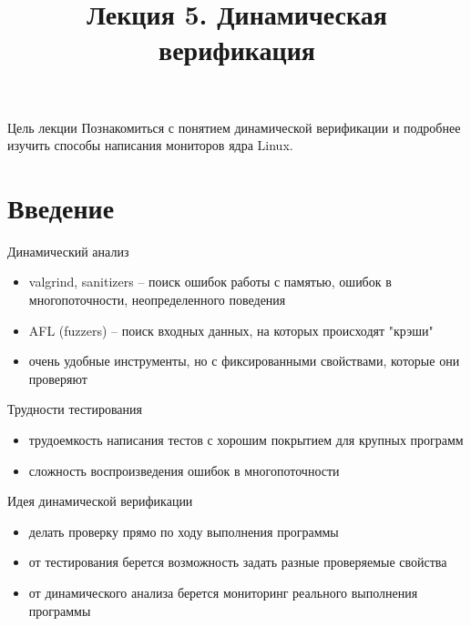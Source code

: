 \documentclass[hyperref={unicode=true}]{beamer}
\title{Лекция 5. Динамическая верификация}
\author{}
\date{}
\begin{document}
	\begin{frame}{}
		\titlepage
	\end{frame}

    \begin{frame}{Цель лекции}
    Познакомиться с понятием динамической верификации
    и подробнее изучить способы написания мониторов ядра Linux.
    \end{frame}

    \section{Введение}

	\begin{frame}{Динамический анализ}
    \begin{itemize}
        \item valgrind, sanitizers -- поиск ошибок работы
        с памятью, ошибок в многопоточности, неопределенного
        поведения

        \item AFL (fuzzers) -- поиск входных данных, на которых
        происходят "крэши"

        \item очень удобные инструменты, но с фиксированными
        свойствами, которые они проверяют
	\end{itemize}
    \end{frame}

    \begin{frame}{Трудности тестирования}
    \begin{itemize}
        \item трудоемкость написания тестов с хорошим
        покрытием для крупных программ

        \item сложность воспроизведения ошибок
        в многопоточности
    \end{itemize}
    \end{frame}

    \begin{frame}{Идея динамической верификации}
    \begin{itemize}
       \item делать проверку прямо по ходу выполнения
       программы
       \item от тестирования берется возможность задать
       разные проверяемые свойства
       \item от динамического анализа берется
       мониторинг реального выполнения программы
    \end{itemize}
    \end{frame}
\end{document}
